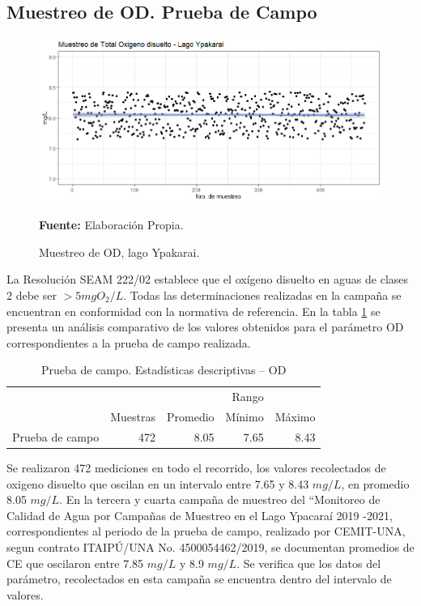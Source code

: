 \subsection{Muestreo de OD. Prueba de Campo}

\begin{figure}[H]
        \centering
        \includegraphics[width=0.75\linewidth]{Imagenes/cap4/OD_Lago Ypakarai.png}
        \caption {Muestreo de OD, lago Ypakarai.}{\textbf{Fuente:}
        Elaboraci\'on Propia. }
        \label{fig:Lago_od}
\end{figure}

La Resoluci\'on SEAM 222/02 establece que el ox\'igeno disuelto en aguas de clases 2 debe ser  $> 5 mg O_2/L$. Todas las determinaciones realizadas en la campa\~na se encuentran en conformidad con la normativa de referencia.
En la tabla \ref{table:Lago_od} se presenta un an\'alisis comparativo de los valores obtenidos para el par\'ametro OD correspondientes a la prueba de campo  realizada.

\begin{table}[H]
\centering
\caption{Prueba de campo. Estadísticas descriptivas – OD}
\label{table:Lago_od}
\begin{tabular}{lrrrr}
\toprule
          & \multicolumn{3}{r}{Rango} \\ \cline{4-5}
          & Muestras & Promedio & Mínimo & Máximo \\
\midrule
Prueba de campo  &      472 &     8.05 &   7.65 &   8.43 \\
\bottomrule
\end{tabular}
\end{table}

Se realizaron 472 mediciones en todo el recorrido, los valores recolectados de oxigeno disuelto que oscilan en  un intervalo entre 7.65   y 8.43 $mg/L$, en promedio 8.05 $mg/L$.
En la tercera \cite{3er_Cemit} y cuarta \cite{4to_Cemit} campaña de muestreo del “Monitoreo de Calidad de Agua por Campañas de Muestreo en el Lago Ypacaraí 2019 -2021, correspondientes al periodo de la prueba de campo, realizado por CEMIT-UNA, segun contrato ITAIPÚ/UNA No. 4500054462/2019, se documentan promedios de CE que oscilaron entre 7.85 $mg/L$ y 8.9 $mg/L$. 
Se verifica que los datos del par\'ametro, recolectados en esta campa\~na se encuentra dentro del intervalo de valores.

